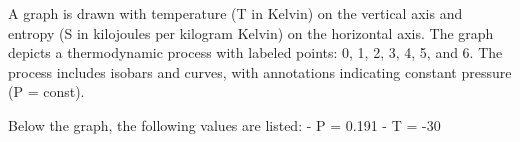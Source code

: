 A graph is drawn with temperature (T in Kelvin) on the vertical axis and entropy (S in kilojoules per kilogram Kelvin) on the horizontal axis. The graph depicts a thermodynamic process with labeled points: 0, 1, 2, 3, 4, 5, and 6. The process includes isobars and curves, with annotations indicating constant pressure (P = const).  

Below the graph, the following values are listed:  
- P = 0.191  
- T = -30